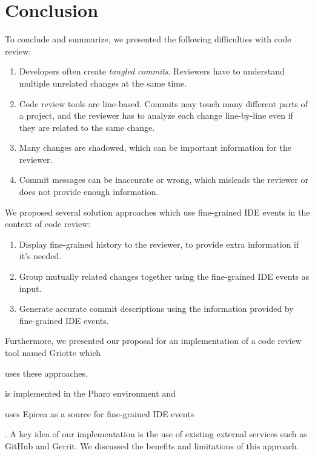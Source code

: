 \documentclass[conference,a4paper]{IEEEtran}
\begin{document}
\section{Conclusion}
\label{sec:conclusion}

To conclude and summarize, we presented the following difficulties
with code review:
\begin{enumerate}[label=(\arabic*)]
\item Developers often create \textit{tangled commits}. Reviewers have
  to understand multiple unrelated changes at the same time.
\item Code review tools are line-based. Commits may touch many
  different parts of a project, and the reviewer has to analyze each
  change line-by-line even if they are related to the same change.
\item Many changes are shadowed, which can be important information
  for the reviewer.
\item Commit messages can be inaccurate or wrong, which misleads the
  reviewer or does not provide enough information.
\end{enumerate}

We proposed several solution approaches which use fine-grained IDE
events in the context of code review:
\begin{enumerate}[label=(\arabic*)]
\item Display fine-grained history to the reviewer, to provide extra
  information if it's needed.
\item Group mutually related changes together using the fine-grained
  IDE events as input.
\item Generate accurate commit descriptions using the information
  provided by fine-grained IDE events.
\end{enumerate}

Furthermore, we presented our proposal for an implementation of a code
review tool named Griotte which \begin{enumerate*}[label=(\arabic*)]
\item uses these approaches, \item is implemented in the Pharo
  environment and \item uses Epicea as a source for fine-grained IDE
  events \end{enumerate*}. A key idea of our implementation is the use
of existing external services such as GitHub and Gerrit. We discussed
the benefits and limitations of this approach.



\end{document}
